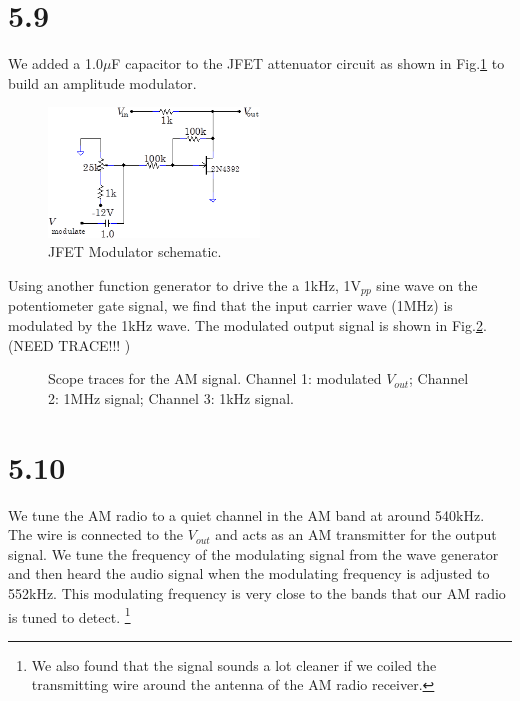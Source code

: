 \documentclass[authoryear, 12pt,5p, times]{elsarticle}
\begin{document}
 \section*{5.9}
 We added a 1.0$\mu$F capacitor to the JFET attenuator circuit as shown in Fig.\ref{q9setup} to build an amplitude modulator. 
  \begin{figure}
 \centering
 \includegraphics[width=0.5\textwidth]{figure/q9setup}
\caption{JFET Modulator schematic.}
\label{q9setup}
 \end{figure}
 Using another function generator to drive the a 1kHz, 1V$_{pp}$ sine wave on the potentiometer gate signal, we find that the input carrier wave (1MHz) is modulated by the 1kHz wave. The modulated output signal is shown in Fig.\ref{q9trace}.  (NEED TRACE!!! )
 \begin{figure}
 \centering
\caption{Scope traces for the AM signal. Channel 1: modulated $V_{out}$; Channel 2: 1MHz signal; Channel 3: 1kHz signal.}
\label{q9trace}
 \end{figure}
  \section*{5.10}
We tune the AM radio to a quiet channel in the AM band at around 540kHz. The wire is connected to the $V_{out}$ and acts as an AM transmitter for the output signal. We tune the frequency of the modulating signal from the wave generator and then heard the audio signal when the modulating frequency is adjusted to 552kHz. This modulating frequency is very close to the bands that our AM radio is tuned to detect. \footnote{We also found that the signal sounds a lot cleaner if we coiled the transmitting wire around the antenna of the AM radio receiver.}
\end{document}
